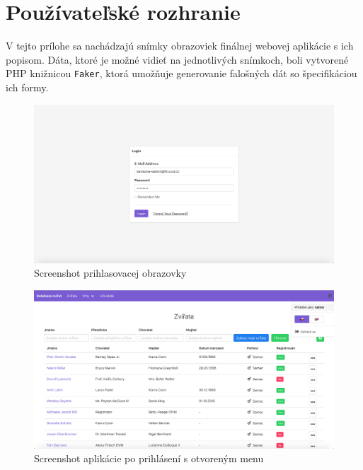 \chapter{Používateľské rozhranie}
V tejto prílohe sa nachádzajú snímky obrazoviek finálnej webovej aplikácie s ich popisom. Dáta, ktoré je možné vidieť na jednotlivých snímkoch, boli vytvorené PHP knižnicou \texttt{Faker}, ktorá umožňuje generovanie falošných dát so špecifikáciou ich formy.

\vspace*{\fill}

\begin{figure}[H]
	\includegraphics[width=1.0\textwidth]{media/priloha/vseobecne/1.png}
	\caption{Screenshot prihlasovacej obrazovky}
\end{figure}

\begin{figure}[H]
	\includegraphics[width=1.0\textwidth]{media/priloha/vseobecne/2.png}
	\caption{Screenshot aplikácie po prihlásení s otvoreným menu}
\end{figure}

\vspace*{\fill}


